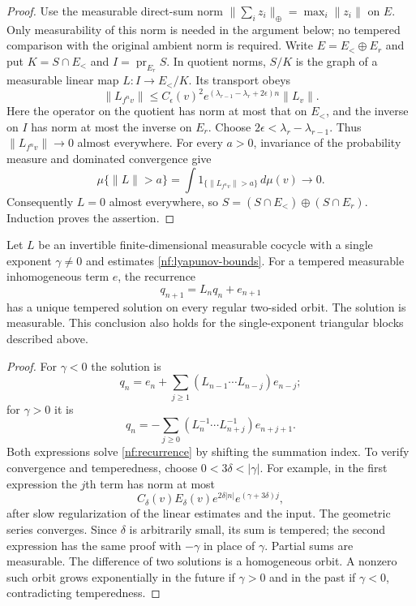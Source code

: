 \begin{proof}
Use the measurable direct-sum norm
$\|\sum_i z_i\|_\oplus=\max_i\|z_i\|$ on $E$.
Only measurability of this norm is needed in the argument below;
no tempered comparison with the original ambient norm is required.
Write $E=E_<\oplus E_r$ and put $K=S\cap E_<$ and
$I=\operatorname{pr}_{E_r}S$.  In quotient norms, $S/K$ is the graph of
a measurable linear map $L:I\to E_</K$.  Its transport obeys
\[
 \|L_{f^n v}\|
 \leq C_\epsilon(v)^2
 e^{(\lambda_{r-1}-\lambda_r+2\epsilon)n}\|L_v\|.
\]
Here the operator on the quotient has norm at most that on $E_<$,
and the inverse on $I$ has norm at most the inverse on $E_r$.
Choose $2\epsilon<\lambda_r-\lambda_{r-1}$.  Thus
$\|L_{f^n v}\|\to0$ almost everywhere.  For every $a>0$, invariance of
the probability measure and dominated convergence give
\[
 \mu\{\|L\|>a\}
 =\int 1_{\{\|L_{f^n v}\|>a\}}\,d\mu(v)\longrightarrow0.
\]
Consequently $L=0$ almost everywhere, so
$S=(S\cap E_<)\oplus(S\cap E_r)$.  Induction proves the assertion.
\end{proof}

\begin{lemma}\label{nf:homological}
Let $L$ be an invertible finite-dimensional measurable cocycle with a
single exponent $\gamma\ne0$ and estimates
\eqref{nf:lyapunov-bounds}.  For a tempered measurable inhomogeneous
term $e$, the recurrence
\begin{equation}\label{nf:recurrence}
 q_{n+1}=L_nq_n+e_{n+1}
\end{equation}
has a unique tempered solution on every regular two-sided orbit.
The solution is measurable.  This conclusion also holds for the
single-exponent triangular blocks described above.
\end{lemma}

\begin{proof}
For $\gamma<0$ the solution is
\[
 q_n=e_n+\sum_{j\geq1}
       (L_{n-1}\cdots L_{n-j})e_{n-j};
\]
for $\gamma>0$ it is
\[
 q_n=-\sum_{j\geq0}
       (L_n^{-1}\cdots L_{n+j}^{-1})e_{n+j+1}.
\]
Both expressions solve \eqref{nf:recurrence} by shifting the summation
index.  To verify convergence and temperedness, choose
$0<3\delta<|\gamma|$.  For example, in the first expression the $j$th
term has norm at most
\[
 C_\delta(v)E_\delta(v)
 e^{2\delta|n|}e^{(\gamma+3\delta)j},
\]
after slow regularization of the linear estimates and the input.
The geometric series converges.  Since $\delta$ is arbitrarily small,
its sum is tempered; the second expression has the same proof with
$-\gamma$ in place of $\gamma$.  Partial sums are measurable.  The
difference of two solutions is a homogeneous orbit.  A nonzero such
orbit grows exponentially in the future if $\gamma>0$ and in the
past if $\gamma<0$, contradicting temperedness.
\end{proof}


